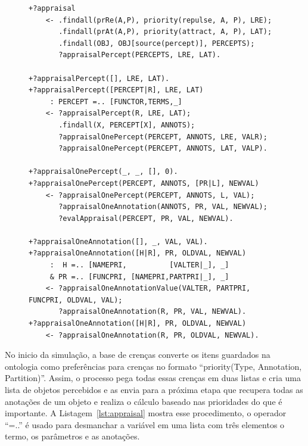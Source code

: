 \begin{figure}
\begin{center}
    \begin{minipage}{130mm}
	\lstset{linewidth=130mm}
	\begin{lstlisting}[frame=trbl,
caption=Amostra de código referente ao processo de avaliação considerando as
preferências.,
label=lst:appraisal]
+?appraisal
    <- .findall(prRe(A,P), priority(repulse, A, P), LRE);
       .findall(prAt(A,P), priority(attract, A, P), LAT);
       .findall(OBJ, OBJ[source(percept)], PERCEPTS);
       ?appraisalPercept(PERCEPTS, LRE, LAT).

+?appraisalPercept([], LRE, LAT).
+?appraisalPercept([PERCEPT|R], LRE, LAT)
     : PERCEPT =.. [FUNCTOR,TERMS,_]
    <- ?appraisalPercept(R, LRE, LAT);
       .findall(X, PERCEPT[X], ANNOTS);
       ?appraisalOnePercept(PERCEPT, ANNOTS, LRE, VALR);
       ?appraisalOnePercept(PERCEPT, ANNOTS, LAT, VALP).

+?appraisalOnePercept(_, _, [], 0).
+?appraisalOnePercept(PERCEPT, ANNOTS, [PR|L], NEWVAL)
    <- ?appraisalOnePercept(PERCEPT, ANNOTS, L, VAL);
       ?appraisalOneAnnotation(ANNOTS, PR, VAL, NEWVAL);
       ?evalAppraisal(PERCEPT, PR, VAL, NEWVAL).

+?appraisalOneAnnotation([], _, VAL, VAL).
+?appraisalOneAnnotation([H|R], PR, OLDVAL, NEWVAL)
     :  H =.. [NAMEPRI,          [VALTER|_], _]
     & PR =.. [FUNCPRI, [NAMEPRI,PARTPRI|_], _]
    <- ?appraisalOneAnnotationValue(VALTER, PARTPRI, FUNCPRI, OLDVAL, VAL);
       ?appraisalOneAnnotation(R, PR, VAL, NEWVAL).
+?appraisalOneAnnotation([H|R], PR, OLDVAL, NEWVAL)
    <- ?appraisalOneAnnotation(R, PR, OLDVAL, NEWVAL).
	\end{lstlisting}
    \end{minipage}
\end{center}
\end{figure}

No inicio da simulação, a base de crenças converte os itens guardados na
ontologia como preferências para crenças no formato ``priority(Type,
Annotation, Partition)''. Assim, o processo pega todas essas crenças em duas listas
e cria uma lista de objetos percebidos e as envia para a próxima etapa
que recupera todas as anotações de um objeto e realiza o cálculo baseado nas
prioridades do que é importante. A Listagem~\ref{lst:appraisal} mostra esse
procedimento, o operador ``=..'' é usado para desmanchar a variável em uma
lista com três elementos o termo, os parâmetros e as anotações.

